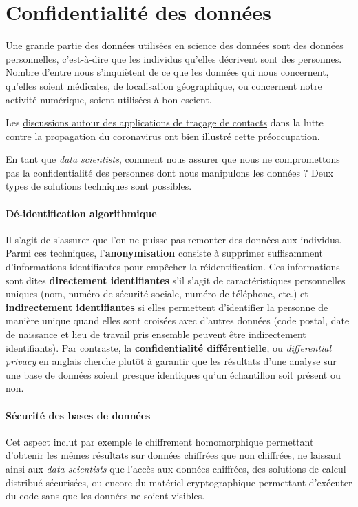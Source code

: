 \section{Confidentialité des données}
Une grande partie des données utilisées en science des données sont des données
personnelles, c'est-à-dire que les individus qu'elles décrivent sont des
personnes. Nombre d'entre nous s'inquiètent de ce que les données qui nous
concernent, qu'elles soient médicales, de localisation géographique, ou
concernent notre activité numérique, soient utilisées à bon escient.

Les \href{https://risques-tracage.fr/}{discussions autour des applications de traçage de
contacts}
dans la lutte contre la propagation du coronavirus ont bien illustré cette
préoccupation.


En tant que \textit{data scientists}, comment nous assurer que nous ne
compromettons pas la confidentialité des personnes dont nous manipulons les
données ? Deux types de solutions techniques sont possibles.
\paragraph{Dé-identification algorithmique} Il s'agit de s'assurer que l'on ne
puisse pas remonter des données aux individus. Parmi ces techniques,
l'\textbf{anonymisation} consiste à supprimer suffisamment d'informations
identifiantes pour empêcher la réidentification. Ces informations sont dites
\textbf{directement identifiantes} s'il s'agit de caractéristiques personnelles
uniques (nom, numéro de sécurité sociale, numéro de téléphone, etc.) et
\textbf{indirectement identifiantes} si elles permettent d'identifier la
personne de manière unique quand elles sont croisées avec d'autres données
(code postal, date de naissance et lieu de travail pris ensemble peuvent être
indirectement identifiants).  Par contraste, la \textbf{confidentialité
  différentielle}, ou \textit{differential privacy} en anglais cherche plutôt à
garantir que les résultats d'une analyse sur une base de données soient presque
identiques qu'un échantillon soit présent ou non.

\paragraph{Sécurité des bases de données} Cet aspect inclut par exemple le
chiffrement homomorphique per\-met\-tant d'obtenir les mêmes résultats sur données
chiffrées que non chiffrées, ne laissant ainsi aux \textit{data scientists} que
l'accès aux données chiffrées, des solutions de calcul distribué sécurisées, ou
encore du matériel cryptographique permettant d'exécuter du code sans que les
données ne soient visibles.

